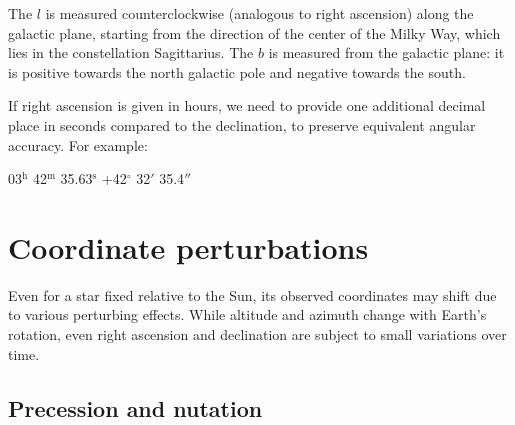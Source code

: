 \vspace{0.2em}

The  $l$ is measured counterclockwise (analogous to right ascension) along the galactic plane, starting from the direction of the center of the Milky Way, which lies in the constellation Sagittarius. The  $b$ is measured from the galactic plane: it is positive towards the north galactic pole and negative towards the south. 

\begin{observationblock}
 If right ascension is given in hours, we need to provide one additional decimal place in seconds compared to the declination, to preserve equivalent angular accuracy. For example:
\begin{center}
03$^\mathrm{h}$ 42$^\mathrm{m}$ 35.63$^\mathrm{s}$ \hspace{1em} +42$^\circ$ 32$'$ 35.4$''$
\end{center}
 
\end{observationblock}

\section{Coordinate perturbations}

Even for a star fixed relative to the Sun, its observed coordinates may shift due to various perturbing effects. While altitude and azimuth change with Earth's rotation, even right ascension and declination are subject to small variations over time.

\vspace{-0.6em}

\subsection{Precession and nutation}

\vspace{-0.5em}

